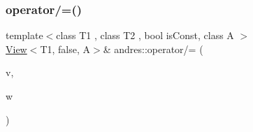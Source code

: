 \subsubsection{\texorpdfstring{operator/=()}{operator/=()}}
{\footnotesize\ttfamily template$<$class T1 , class T2 , bool is\+Const, class A $>$ \\
\hyperlink{classandres_1_1View}{View}$<$T1, false, A$>$\& andres\+::operator/= (\begin{DoxyParamCaption}\item[{\hyperlink{classandres_1_1View}{View}$<$ T1, false, A $>$ \&}]{v,  }\item[{const \hyperlink{classandres_1_1View}{View}$<$ T2, is\+Const, A $>$ \&}]{w }\end{DoxyParamCaption})\hspace{0.3cm}{\ttfamily [inline]}}

